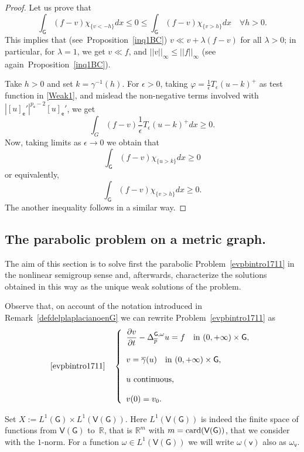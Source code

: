 \documentclass[reqno,12pt]{amsart}
\def\e{\mathsf{e}} 	%
\def\v{\mathsf{v}}	%
\newcommand{\G}{\mathsf{G}}	%
\newcommand{\V}{\mathsf{V}}	%
\numberwithin{equation}{section} %
\begin{document}
\begin{proof}
Let us prove that
$$\int_\G(f-v)\chi_{\{v<-h\}}dx\le 0\le  \int_\G (f-v)\chi_{\{v>h\}}dx\quad\forall h>0.$$ This implies that (see~Proposition~\ref{inq1BC})
$ v\ll v +\lambda(f-v)$ for all $\lambda>0$; in particular, for $\lambda=1$, we get $v\ll f$, and $||v||_\infty\le ||f||_\infty$ (see again~Proposition~\ref{inq1BC}).

Take $h>0$ and set $k=\gamma^{-1}(h)$. For $\epsilon>0$, taking $\varphi=\frac{1}{\epsilon}T_\epsilon(u-k)^+$ as test function in \eqref{Weak1}, and  mislead the non-negative  terms involved with $|[u]_\e'|^{p_\e-2}[u]_\e'$, we  get
$$\int_G(f-v)\frac{1}{\epsilon}T_\epsilon(u-k)^+dx\ge 0.$$
Now, taking limits as $\epsilon\to 0$ we obtain that 
$$\int_\G (f-v)\chi_{\{u>k\}} dx\ge 0$$
or equivalently,
$$\int_\G (f-v)\chi_{\{v>h\}} dx\ge 0.$$
The another inequality follows in a similar way.
\end{proof}
 


\subsection{The parabolic problem on a metric graph.}
    The aim of this section is to solve first the parabolic Problem~\eqref{evpbintro1711} in the nonlinear semigroup sense and, afterwards, characterize the solutions obtained in this way as the unique weak solutions of the problem. 

 Observe that, on account of the notation introduced in   Remark~\ref{defdelplaplacianoenG} we can rewrite Problem~\eqref{evpbintro1711} as
 $$  \hbox{\eqref{evpbintro1711}}\quad \left\{\begin{array}{l}\displaystyle
\frac{\partial v}{\partial t}-\Delta^{\G,\omega}_{\overline{p}}u=f\quad\hbox{in } (0,+\infty)\times \G,\\
\\{}
v=\overline{\gamma}(u)\quad\hbox{in } (0,+\infty)\times\G,
\\ \\
\hbox{$u$ continuous,}
\\ \\
v(0)=v_0.
\end{array}\right.$$


Set $X:=L^{1}(\G)\times L^1(\V(\G))$. Here $L^1(\V(\G))$ is indeed the finite space of functions from $\V(\G)$ to~$\mathbb{R}$, that is $\mathbb{R}^m$ with $m=\hbox{card}(\V( \G))$, that we consider with the $1$-norm. For a function $\omega\in L^1(\V(\G))$ we will write $\omega(\v)$ also as $\omega_\v$.
\end{document}
